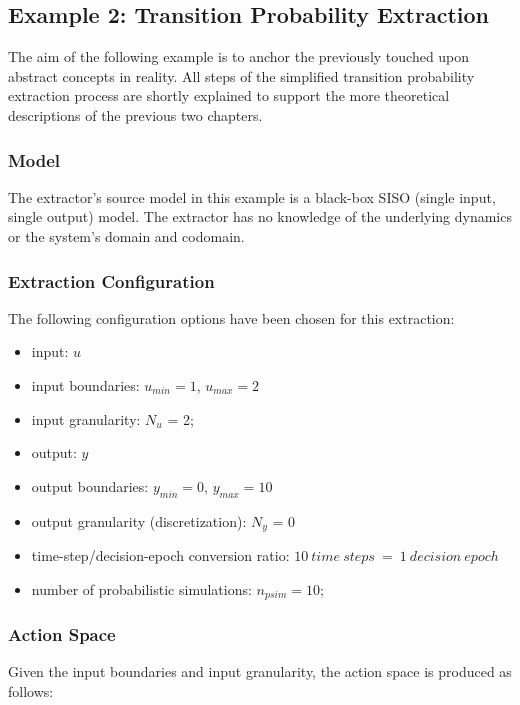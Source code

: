 \subsection{Example 2: Transition Probability Extraction}
\label{subsec:extractexample}

The aim of the following example is to anchor the previously touched upon abstract concepts in reality. All steps of the simplified transition probability extraction process are shortly explained to support the more theoretical descriptions of the previous two chapters.

\subsubsection{Model}

The extractor's source model in this example is a black-box SISO (single input, single output) model. The extractor has no knowledge of the underlying dynamics or the system's domain and codomain.

\subsubsection{Extraction Configuration}
\label{subsubsec:extractionconfig}

The following configuration options have been chosen for this extraction:

\begin{itemize}
\item input: $u$
\item input boundaries: $u_{min} = 1$, $u_{max} = 2$
\item input granularity: $N_u$ = 2;
\item output: $y$
\item output boundaries: $y_{min} = 0$, $y_{max} = 10$
\item output granularity (discretization): $N_y$ = 0
\item time-step/decision-epoch conversion ratio: $10\ time\ steps\ =\ 1\ decision\ epoch$
\item number of probabilistic simulations: $n_{psim} = 10$;
\end{itemize}

\subsubsection{Action Space}

Given the input boundaries and input granularity, the action space is produced as follows:

